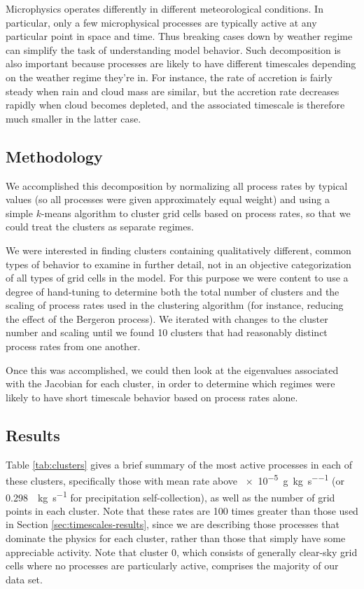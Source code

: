 \documentclass [11pt, proquest] {uwthesis}[2020/02/24]
\begin{document}
Microphysics operates differently in different meteorological conditions. In particular, only a few microphysical processes are typically active at any particular point in space and time. Thus breaking cases down by weather regime can simplify the task of understanding model behavior. Such decomposition is also important because processes are likely to have different timescales depending on the weather regime they're in. For instance, the rate of accretion is fairly steady when rain and cloud mass are similar, but the accretion rate decreases rapidly when cloud becomes depleted, and the associated timescale is therefore much smaller in the latter case.

\subsection{Methodology}

We accomplished this decomposition by normalizing all process rates by typical values (so all processes were given approximately equal weight) and using a simple $k$-means algorithm to cluster grid cells based on process rates, so that we could treat the clusters as separate regimes.

We were interested in finding clusters containing qualitatively different, common types of behavior to examine in further detail, not in an objective categorization of all types of grid cells in the model. For this purpose we were content to use a degree of hand-tuning to determine both the total number of clusters and the scaling of process rates used in the clustering algorithm (for instance, reducing the effect of the Bergeron process). We iterated with changes to the cluster number and scaling until we found \num{10} clusters that had reasonably distinct process rates from one another.

Once this was accomplished, we could then look at the eigenvalues associated with the Jacobian for each cluster, in order to determine which regimes were likely to have short timescale behavior based on process rates alone.

\subsection{Results}

Table \ref{tab:clusters} gives a brief summary of the most active processes in each of these clusters, specifically those with mean rate above \SI{e-5}{\gram\per\kilo\gram\per\second} (or \SI{0.298}{\per\kilo\gram\per\second} for precipitation self-collection), as well as the number of grid points in each cluster. Note that these rates are \num{100} times greater than those used in Section \ref{sec:timescales-results}, since we are describing those processes that dominate the physics for each cluster, rather than those that simply have some appreciable activity. Note that cluster 0, which consists of generally clear-sky grid cells where no processes are particularly active, comprises the majority of our data set.
\end{document}
